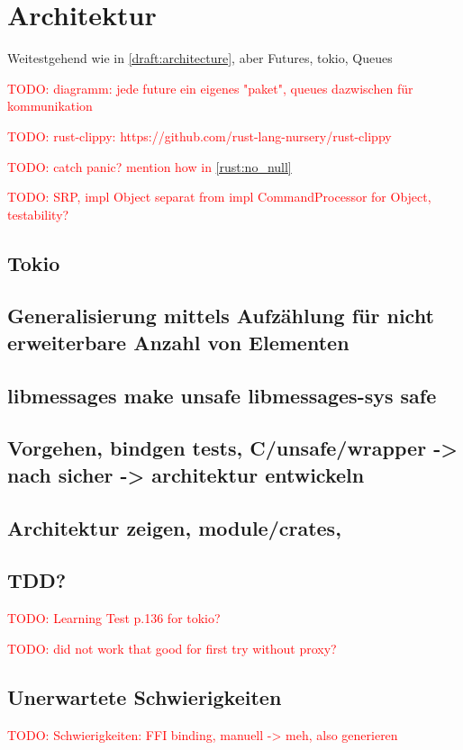 \documentclass[
	12pt,
	table,
	bigheadings,
	ngerman,
	a4paper,
	BCOR5mm,
	DIV14,
	1.1headlines,
	pagesize,
	oneside,
	openright,
	titlepage,
	headsepline,
	nochapterprefix,
	bibtotoc,
	tocindent,
	listsindent,
	pointlessnumbers,
	cleardoubleempty,
	fleqn,
	halfparskip
]{scrbook}
\newcommand{\todo}[1]{\textcolor{red}{TODO: #1}}
\begin{document}
	\section{Architektur}
	
	Weitestgehend wie in \autoref{draft:architecture}, aber Futures, tokio, Queues
	
	\todo{diagramm: jede future ein eigenes "paket", queues dazwischen für kommunikation}
	
	\todo{rust-clippy: https://github.com/rust-lang-nursery/rust-clippy}
	
	\todo{catch panic? mention how in \autoref{rust:no_null}}
	
	\todo{SRP, impl Object separat from impl CommandProcessor for Object, testability?}
	
	\subsection{Tokio}
	
		\subsection{Generalisierung mittels Aufzählung für nicht erweiterbare Anzahl von Elementen}
		
		\subsection{libmessages make unsafe libmessages-sys safe}
		
		\subsection{Vorgehen, bindgen tests, C/unsafe/wrapper -> nach sicher ->  architektur entwickeln}
		
		\subsection{Architektur zeigen, module/crates, }
	
		\subsection{TDD?}
		\todo{Learning Test p.136 for tokio?}
		
		\todo{did not work that good for first try without proxy?}
		
		\subsection{Unerwartete Schwierigkeiten}
		\label{impl:issue:ffi}
		\todo{Schwierigkeiten: FFI binding, manuell -> meh, also generieren}
			
\end{document}
